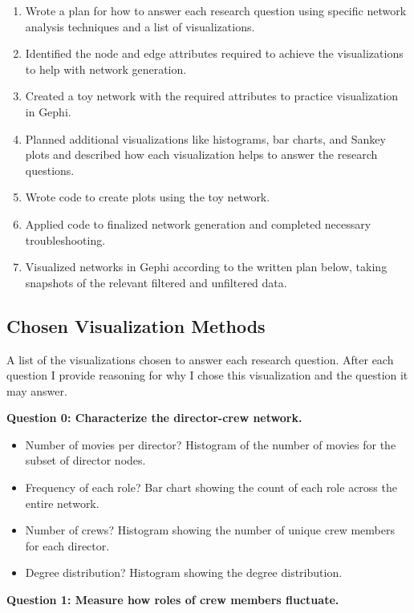 \documentclass[12pt]{article}
\begin{document}
\begin{enumerate}

\item Wrote a plan for how to answer each research question using specific network analysis techniques and a list of visualizations.
\item Identified the node and edge attributes required to achieve the visualizations to help with network generation.
\item Created a toy network with the required attributes to practice visualization in Gephi.
\item Planned additional visualizations like histograms, bar charts, and Sankey plots and described how each visualization helps to answer the research questions.
\item Wrote code to create plots using the toy network.
\item Applied code to finalized network generation and completed necessary troubleshooting.
\item Visualized networks in Gephi according to the written plan below, taking snapshots of the relevant filtered and unfiltered data.

\end{enumerate}

\subsection*{Chosen Visualization Methods}
A list of the visualizations chosen to answer each research question. After each question I provide reasoning for why I chose this visualization and the question it may answer. 

\textbf{Question 0: Characterize the director-crew network.}

\begin{itemize}
\item Number of movies per director? Histogram of the number of movies for the subset of director nodes.
\item Frequency of each role? Bar chart showing the count of each role across the entire network.
\item Number of crews? Histogram showing the number of unique crew members for each director.
\item Degree distribution? Histogram showing the degree distribution.
\end{itemize}

\textbf{Question 1: Measure how roles of crew members fluctuate.}
\end{document}
